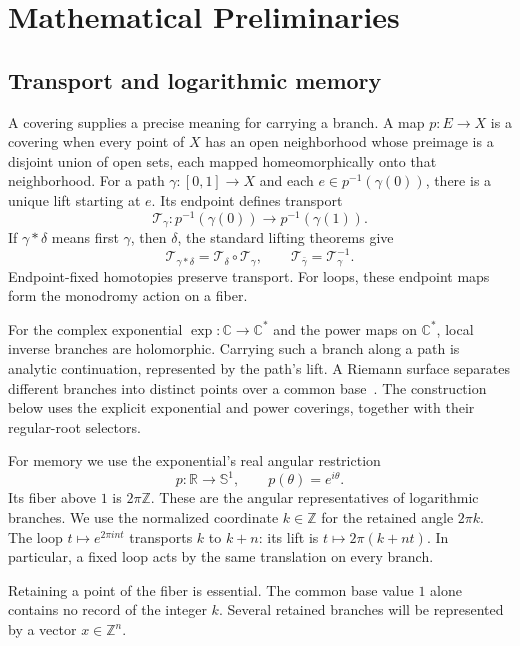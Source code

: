 \documentclass[11pt]{article}
\numberwithin{equation}{section}
\theoremstyle{definition}
\theoremstyle{remark}
\newcommand{\Z}{\mathbb Z}
\newcommand{\R}{\mathbb R}
\newcommand{\C}{\mathbb C}
\newcommand{\Sone}{\mathbb S^1}
\begin{document}
\section{Mathematical Preliminaries}
\label{sec:foundations}

\subsection{Transport and logarithmic memory}

A covering supplies a precise meaning for carrying a branch. A map
$p:E\to X$ is a covering when every point of $X$ has an open
neighborhood whose preimage is a disjoint union of open sets, each
mapped homeomorphically onto that neighborhood. For a path
$\gamma:[0,1]\to X$ and
each $e\in p^{-1}(\gamma(0))$, there is a unique lift starting at $e$.
Its endpoint defines transport
\[
 \mathcal T_\gamma:p^{-1}(\gamma(0))\longrightarrow p^{-1}(\gamma(1)).
\]
If $\gamma*\delta$ means first $\gamma$, then $\delta$, the standard
lifting theorems give~\cite[\S1.3]{hatcher2002}
\begin{equation}\label{eq:transport}
 \mathcal T_{\gamma*\delta}=\mathcal T_\delta\circ\mathcal T_\gamma,
 \qquad \mathcal T_{\bar\gamma}=\mathcal T_\gamma^{-1}.
\end{equation}
Endpoint-fixed homotopies preserve transport. For loops, these endpoint
maps form the monodromy action on a fiber.

For the complex exponential $\exp:\C\to\C^*$ and the power maps on
$\C^*$, local inverse branches are holomorphic. Carrying such a
branch along a path is analytic continuation, represented by the path's
lift. A Riemann surface separates different branches into distinct
points over a common base~\cite{forster1981}. The construction below
uses the explicit exponential and power coverings, together with their
regular-root selectors.

For memory we use the exponential's real angular restriction
\begin{equation}\label{eq:log-cover}
 p:\R\longrightarrow\Sone,\qquad p(\theta)=e^{i\theta}.
\end{equation}
Its fiber above $1$ is $2\pi\Z$. These are the angular representatives
of logarithmic branches. We use the normalized coordinate $k\in\Z$ for
the retained angle $2\pi k$. The loop
$t\mapsto e^{2\pi i nt}$ transports $k$ to $k+n$: its lift is
$t\mapsto2\pi(k+nt)$. In particular, a fixed loop acts by the same
translation on every branch.

Retaining a point of the fiber is essential. The common base value $1$
alone contains no record of the integer $k$. Several retained branches
will be represented by a vector $x\in\Z^n$.
\end{document}
